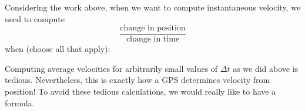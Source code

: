 \documentclass{ximera}
\begin{document}
\begin{problem}
  Considering the work above, when we want to compute instantaneous
  velocity, we need to compute
  \[
  \frac{\text{change in position}}{\text{change in time}}
  \]
  when (choose all that apply):
 \begin{selectAll}
 \end{selectAll}
\end{problem}


Computing average velocities for arbitrarily small values of
$\Delta t$ as we did above is tedious. Nevertheless, this is exactly
how a GPS determines velocity from position! To avoid these tedious
calculations, we would really like to have a formula.





\end{document}
